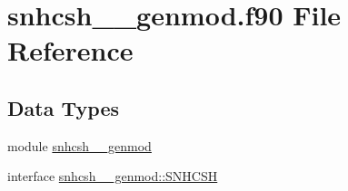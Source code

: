 \hypertarget{snhcsh____genmod_8f90}{\section{snhcsh\+\_\+\+\_\+genmod.\+f90 File Reference}
\label{snhcsh____genmod_8f90}
}
\subsection*{Data Types}
\begin{DoxyCompactItemize}
\item 
module \hyperlink{classsnhcsh____genmod}{snhcsh\+\_\+\+\_\+genmod}
\item 
interface \hyperlink{interfacesnhcsh____genmod_1_1SNHCSH}{snhcsh\+\_\+\+\_\+genmod\+::\+S\+N\+H\+C\+S\+H}
\end{DoxyCompactItemize}
